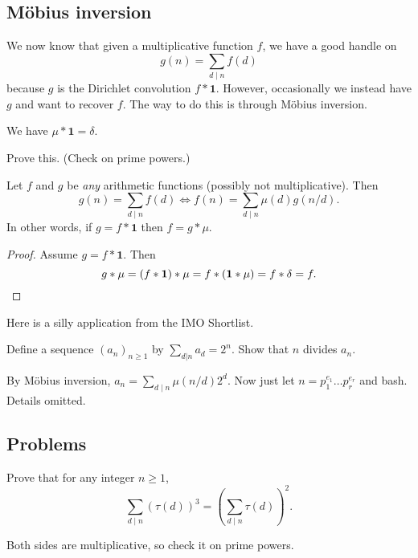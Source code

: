 \documentclass[11pt]{scrartcl}
\begin{document}
\subsection{M\"obius inversion}
We now know that given a multiplicative function $f$, we have a good handle on
\[ g(n) = \sum_{d \mid n} f(d) \]
because $g$ is the Dirichlet convolution $f \ast \mathbf 1$.
However, occasionally we instead have $g$ and want to recover $f$.
The way to do this is through M\"obius inversion.

\begin{lemma}
  We have $\mu \ast \mathbf 1 = \delta$.
\end{lemma}
\begin{exercise}
  Prove this. (Check on prime powers.)
\end{exercise}
\begin{theorem}
  Let $f$ and $g$ be \emph{any} arithmetic functions
  (possibly not multiplicative).
  Then
  \[ g(n) = \sum_{d \mid n} f(d)
    \iff
    f(n) = \sum_{d \mid n} \mu(d) g(n/d).
  \]
  In other words, if $g = f \ast \mathbf 1$ then $f = g \ast \mu$.
\end{theorem}
\begin{proof}
  Assume $g = f \ast \mathbf 1$.
  Then
  \[
    g \ast \mu
    = (f \ast \mathbf 1) \ast \mu
    = f \ast (\mathbf 1 \ast \mu)
    = f \ast \delta = f.
    \qedhere
  \]
\end{proof}

Here is a silly application from the IMO Shortlist.
\begin{example}
  [Shortlist 1989] %
  Define a sequence $(a_n)_{n \ge 1}$ by $\sum_{d|n} a_d = 2^n$.
  Show that $n$ divides $a_n$.
\end{example}
\begin{soln}
  By M\"obius inversion, $a_n = \sum_{d \mid n} \mu(n/d) 2^d$.
  Now just let $n = p_1^{e_1} \dots p_r^{e_r}$ and bash.
  Details omitted.
\end{soln}

\subsection{Problems}
\begin{problem} %
  Prove that for any integer $n \ge 1$,
  \[ \sum_{d \mid n} (\tau(d))^3 = \left( \sum_{d \mid n} \tau(d) \right)^2. \]
  \begin{hint}
    Both sides are multiplicative, so check it on prime powers.
  \end{hint}
\end{problem}
\end{document}
